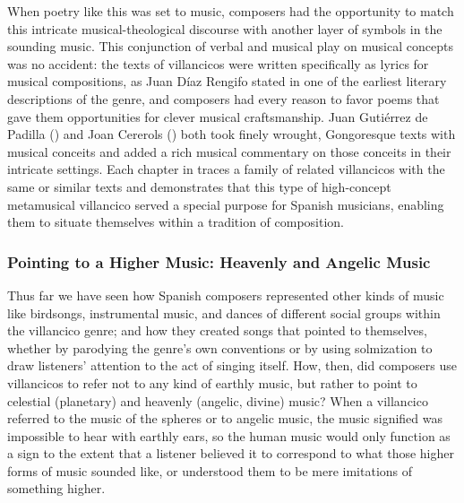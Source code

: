 When poetry like this was set to music, composers had the opportunity to match
this intricate musical-theological discourse with another layer of symbols in
the sounding music.
This conjunction of verbal and musical play on musical concepts was no
accident: the texts of villancicos were written specifically as lyrics for
musical compositions, as Juan Díaz Rengifo stated in one of the earliest
literary descriptions of the genre, and composers had every reason to favor
poems that gave them opportunities for clever musical craftsmanship.%
    \Autocite{Rengifo:ArteMetrica}
Juan Gutiérrez de Padilla () and Joan Cererols
() both took finely wrought, Gongoresque texts with
musical conceits and added a rich musical commentary on those conceits in their
intricate settings.
Each chapter in  traces a family of related
villancicos with the same or similar texts and demonstrates that this type of
high-concept metamusical villancico served a special purpose for Spanish
musicians, enabling them to situate themselves within a tradition of
composition.



\subsubsection{Pointing to a Higher Music: Heavenly and Angelic Music}

Thus far we have seen how Spanish composers represented other kinds of music
like birdsongs, instrumental music, and dances of different social groups
within the villancico genre; and how they created songs that pointed to
themselves, whether by parodying the genre's own conventions or by using
solmization to draw listeners' attention to the act of singing itself.
How, then, did composers use villancicos to refer not to any kind of earthly
music, but rather to point to celestial (planetary) and heavenly (angelic,
divine) music?
When a villancico referred to the music of the spheres or to angelic music, the
music signified was impossible to hear with earthly ears, so the human music
would only function as a sign to the extent that a listener believed it to
correspond to what those higher forms of music sounded like, or understood them
to be mere imitations of something higher.


